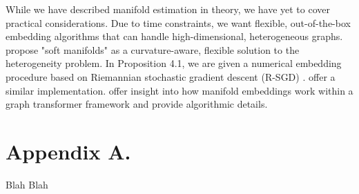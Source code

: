 \documentclass[twoside,11pt]{article}
\begin{document}
While we have described manifold estimation in theory, we have yet to cover practical considerations. Due to time constraints, we want flexible, out-of-the-box embedding algorithms that can handle high-dimensional, heterogeneous graphs.  \citet{digiovanni_etal_2022} propose "soft manifolds" as a curvature-aware, flexible solution to the heterogeneity problem. In \citet{digiovanni_etal_2022} Proposition 4.1, we are given a numerical embedding procedure based on Riemannian stochastic gradient descent (R-SGD) \citep{bonnabel_2013}. \citet{marinoni_etal_2023} offer a similar implementation. \citet{jyothish_jannesari_2025} offer insight into how manifold embeddings work within a graph transformer framework and provide algorithmic details. 

\newpage

\appendix
\section*{Appendix A.} \label{sec:app_a}
Blah Blah 

\newpage 

\end{document}
